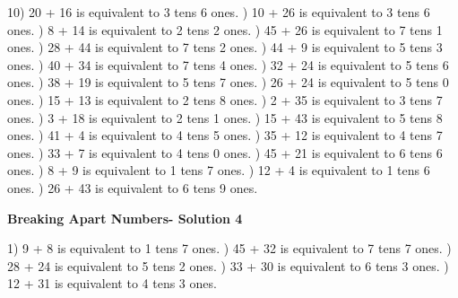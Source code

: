 \documentclass{article}%
\begin{document}
10) 20 + 16 is equivalent to 3 tens 6 ones.%
) 10 + 26 is equivalent to 3 tens 6 ones.%
) 8 + 14 is equivalent to 2 tens 2 ones.%
) 45 + 26 is equivalent to 7 tens 1 ones.%
) 28 + 44 is equivalent to 7 tens 2 ones.%
) 44 + 9 is equivalent to 5 tens 3 ones.%
) 40 + 34 is equivalent to 7 tens 4 ones.%
) 32 + 24 is equivalent to 5 tens 6 ones.%
) 38 + 19 is equivalent to 5 tens 7 ones.%
) 26 + 24 is equivalent to 5 tens 0 ones.%
) 15 + 13 is equivalent to 2 tens 8 ones.%
) 2 + 35 is equivalent to 3 tens 7 ones.%
) 3 + 18 is equivalent to 2 tens 1 ones.%
) 15 + 43 is equivalent to 5 tens 8 ones.%
) 41 + 4 is equivalent to 4 tens 5 ones.%
) 35 + 12 is equivalent to 4 tens 7 ones.%
) 33 + 7 is equivalent to 4 tens 0 ones.%
) 45 + 21 is equivalent to 6 tens 6 ones.%
) 8 + 9 is equivalent to 1 tens 7 ones.%
) 12 + 4 is equivalent to 1 tens 6 ones.%
) 26 + 43 is equivalent to 6 tens 9 ones.%
\newline%
\newpage%
\large%
\begin{center}%
\textbf{Breaking Apart Numbers- Solution 4}%
\newline%
\end{center} \normalsize%
1) 9 + 8 is equivalent to 1 tens 7 ones.%
) 45 + 32 is equivalent to 7 tens 7 ones.%
) 28 + 24 is equivalent to 5 tens 2 ones.%
) 33 + 30 is equivalent to 6 tens 3 ones.%
) 12 + 31 is equivalent to 4 tens 3 ones.%
\end{document}

